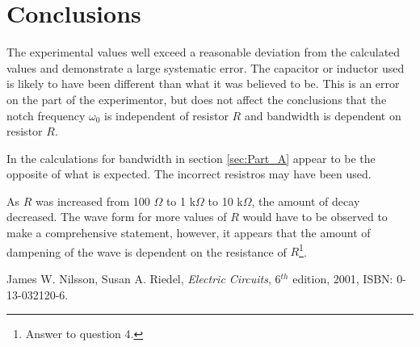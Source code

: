 \documentclass[11pt,onecolumn]{article}
\begin{document}
\section{Conclusions}\label{sec:Conclusions}
The experimental values well exceed a reasonable deviation from the calculated values and demonstrate a large systematic error. The capacitor or inductor used is likely to have been different than what it was believed to be. This is an error on the part of the experimentor, but does not affect the conclusions that the notch frequency $\omega_0$ is independent of resistor $R$ and bandwidth is dependent on resistor $R$.

In the calculations for bandwidth in section \ref{sec:Part_A} appear to be the opposite of what is expected. The incorrect resistros may have been used.

As  $R$ was increased from 100 $\Omega$ to 1 k$\Omega$ to 10 k$\Omega$, the amount of decay decreased. The wave form for more values of $R$ would have to be observed to make a comprehensive statement, however, it appears that the amount of dampening of the wave is dependent on the resistance of $R$\footnote{Answer to question 4.}.

\begin{thebibliography}{9}
 James W. Nilsson, Susan A. Riedel, {\em Electric Circuits}, 6$^{th}$ edition, 2001, ISBN: 0-13-032120-6.
\end{thebibliography}
\end{document}
